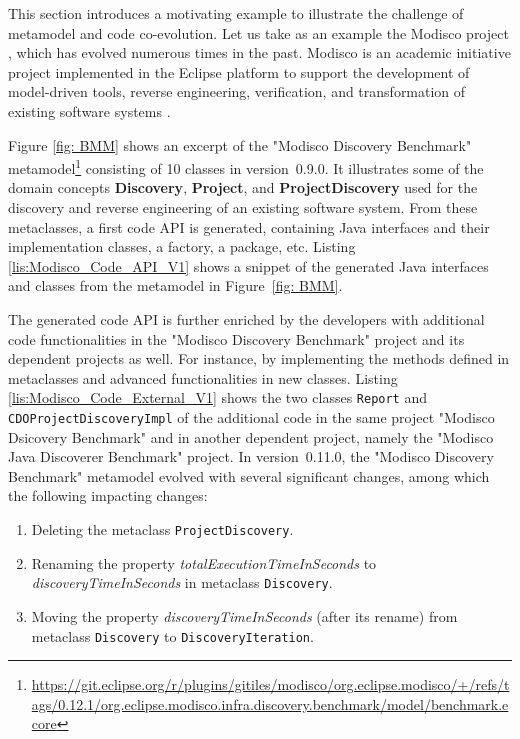 This section introduces a motivating example to illustrate the challenge of metamodel and code co-evolution. 
Let us take as an example the Modisco project \cite{MDTModisco}, which has evolved numerous times in the past. Modisco is an academic initiative project implemented in the Eclipse platform to support the development of model-driven tools, reverse engineering, verification, and transformation of existing software systems \cite{bruneliere2010modisco,bruneliere2014modisco}.


Figure \ref{fig: BMM} shows an excerpt of the "Modisco Discovery Benchmark" metamodel\footnote{\url{https://git.eclipse.org/r/plugins/gitiles/modisco/org.eclipse.modisco/+/refs/tags/0.12.1/org.eclipse.modisco.infra.discovery.benchmark/model/benchmark.ecore}} consisting of 10 classes in version~0.9.0.
It illustrates some of the domain concepts \textbf{Discovery}, \textbf{Project}, and \textbf{ProjectDiscovery}  used for the discovery and reverse engineering of an existing software system. 
From these metaclasses, a first code API is generated, containing Java interfaces and their implementation classes, a factory, a package, etc. Listing \ref{lis:Modisco_Code_API_V1} shows a snippet of the generated Java interfaces and classes from the metamodel in Figure~\ref{fig: BMM}. 

The generated code API is further enriched by the developers with additional code functionalities in the "Modisco Discovery Benchmark" project and its dependent projects as well.
For instance, by implementing the methods defined in metaclasses and advanced functionalities in new classes. Listing \ref{lis:Modisco_Code_External_V1} shows the two classes \texttt{Report} and \texttt{CDOProjectDiscoveryImpl} of the additional code in the same project "Modisco Dsicovery Benchmark" and in another dependent project, namely the "Modisco Java Discoverer Benchmark" project. 
In version~0.11.0, the "Modisco Discovery Benchmark" metamodel evolved with several significant changes, among which the following impacting changes:

\begin{enumerate}%
	
	\item Deleting the metaclass \texttt{ProjectDiscovery}. 
	
	\item Renaming the property \emph{totalExecutionTimeInSeconds} to \emph{discoveryTimeInSeconds} in metaclass \texttt{Discovery}. 
	
	\item Moving the property \emph{discoveryTimeInSeconds} (after its rename) from metaclass \texttt{Discovery} to \texttt{DiscoveryIteration}. 
	
\end{enumerate} 


